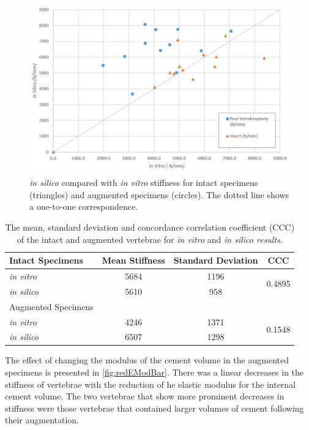 \begin{figure}[ht]
\centering
\includegraphics[width=\textwidth]{images/exp_vs_comp_both.png}
\caption{\textit{in silico} compared with \textit{in vitro} stiffness for intact specimens (triangles) and augmented specimens (circles). The dotted line shows a one-to-one correspondence.}
\label{fig:compvexpscatter}
\end{figure}

\begin{table}[ht]
\centering
\caption{The mean, standard deviation and concordance correlation coefficient (CCC) of the intact and augmented vertebrae for \textit{in vitro} and \textit{in silico results}.}
\label{tab:int}
\begin{tabular}{l|c|c|c}
     Intact Specimens     & Mean Stiffness & Standard Deviation & CCC                     \\ \hline \hline
\textit{in vitro}  & 5684 & 1196             & \multirow{2}{*}{0.4895} \\
\textit{in silico} & 5610 & 958               &                        \\
\hline
 Augmented Specimens
 \\ \hline \hline
\textit{in vitro}  & 4246 & 1371               & \multirow{2}{*}{0.1548} \\
\textit{in silico} & 6507 & 1298               &                      \\ \hline
\end{tabular}
\end{table}

The effect of changing the modulus of the cement volume in the augmented specimens is presented in \cref{fig:redEModBar}. There was a linear decreases in the stiffness of vertebrae with the reduction of he elastic modulus for the internal cement volume. The two vertebrae that show more prominent decreases in stiffness were those vertebrae that contained larger volumes of cement following their augmentation.

